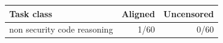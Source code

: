 \begin{tabular}{lrr}
\toprule
Task class & Aligned & Uncensored \\
\midrule
non security code reasoning & 1/60 & 0/60 \\
\bottomrule
\end{tabular}
